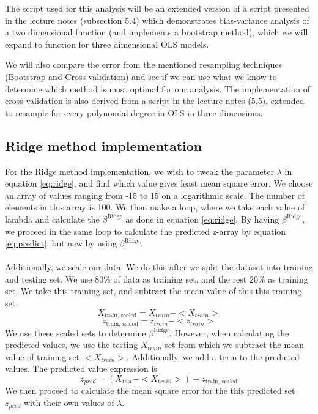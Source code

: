\documentclass[reprint,english,notitlepage]{revtex4-1}  %
\begin{document}
The script used for this analysis will be an extended version of a script presented in the lecture notes (subsection 5.4) which demonstrates bias-variance analysis of a two dimensional function (and implements a bootstrap method), which we will expand to function for three dimensional OLS models.

We will also compare the error from the mentioned resampling techniques (Bootstrap and Cross-validation) and see if we can use what we know to determine which method is most optimal for our analysis. The implementation of cross-validation is also derived from a script in the lecture notes (5.5), extended to resample for every polynomial degree in OLS in three dimensions.

\subsection{Ridge method implementation}

For the Ridge method implementation, we wish to tweak the parameter $\lambda$ in equation \ref{eq:ridge}, and find which value gives least mean square error. We choose an array of values ranging from -15 to 15 on a logarithmic scale. The number of elements in this array is 100. We then make a loop, where we take each value of lambda and calculate the $\beta^{\text{Ridge}}$ as done in equation \ref{eq:ridge}. By having $\beta^{\text{Ridge}}$, we proceed in the same loop to calculate the predicted z-array by equation \ref{eq:predict}, but now by using $\beta^{\text{Ridge}}$.\\
\\
Additionally, we scale our data. We do this after we split the dataset into training and testing set. We use 80\% of data as training set, and the rest 20\% as training set. We take this training set, and subtract the mean value of this this training set.
$$X_{\text{train, scaled}} = X_{train} - <X_{train}>$$
$$z_{\text{train, scaled}} = z_{train} - <z_{train}>$$
We use these scaled sets to determine $\beta^{\text{Ridge}}$.
However, when calculating the predicted values, we use the testing $X_{train}$ set from which we subtract the mean value of training set $<X_{train}>$. Additionally, we add a term to the predicted values. The predicted value expression is
$$z_{pred} = (X_{test} - <X_{train}>) + z_{\text{train, scaled}}$$
We then proceed to calculate the mean square error for the this predicted set $z_{pred}$ with their own values of $\lambda$. 
\end{document}
